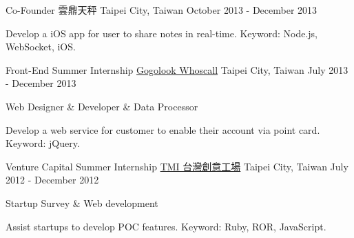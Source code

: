 \begin{cventries}
  \cventry
    {Co-Founder} %
    {雲鼎天秤} %
    {Taipei City, Taiwan} %
    {October 2013 - December 2013} %
    {
      \begin{cvitems} %
        \item {Develop a iOS app for user to share notes in real-time. Keyword: Node.js, WebSocket, iOS.}
      \end{cvitems}
    }

  \cventry
    {Front-End Summer Internship} %
    {\href{https://whoscall.com}{Gogolook Whoscall}} %
    {Taipei City, Taiwan} %
    {July 2013 - December 2013} %
    {
      \begin{cvitems} %
        \item {Web Designer \& Developer \& Data Processor}
        \item {Develop a web service for customer to enable their account via point card. Keyword: jQuery.}
        \end{cvitems}
    }

  \cventry
    {Venture Capital Summer Internship} %
    {\href{http://tmi.vc}{TMI 台灣創意工場}} %
    {Taipei City, Taiwan} %
    {July 2012 - December 2012} %
    {
      \begin{cvitems} %
        \item {Startup Survey \& Web development}
        \item {Assist startups to develop POC features. Keyword: Ruby, ROR, JavaScript.}
      \end{cvitems}
    }

\end{cventries}
